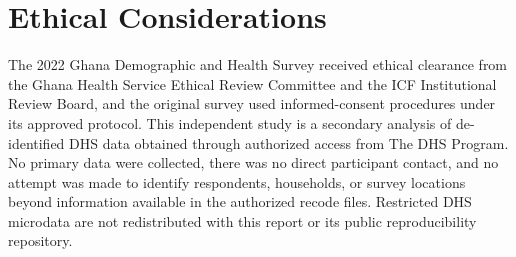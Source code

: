 \chapter*{Ethical Considerations}
\begin{singlespace}
The 2022 Ghana Demographic and Health Survey received ethical clearance from the Ghana Health Service Ethical Review Committee and the ICF Institutional Review Board, and the original survey used informed-consent procedures under its approved protocol. This independent study is a secondary analysis of de-identified DHS data obtained through authorized access from The DHS Program. No primary data were collected, there was no direct participant contact, and no attempt was made to identify respondents, households, or survey locations beyond information available in the authorized recode files. Restricted DHS microdata are not redistributed with this report or its public reproducibility repository.
\end{singlespace}
\clearpage
